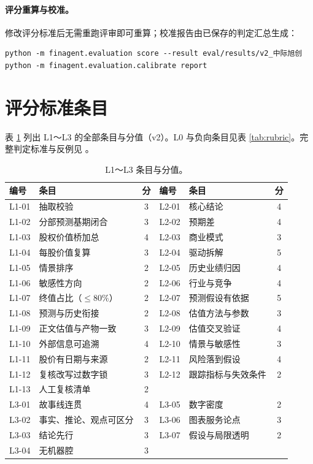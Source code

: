 \paragraph{评分重算与校准。}修改评分标准后无需重跑评审即可重算；校准报告由已保存的判定汇总生成：
\begin{verbatim}
python -m finagent.evaluation score --result eval/results/v2_中际旭创
python -m finagent.evaluation.calibrate report
\end{verbatim}

\section{评分标准条目}
\label{app:rubric}

表 \ref{tab:rubric-full} 列出 L1～L3 的全部条目与分值（v2）。L0 与负向条目见表 \ref{tab:rubric}。完整判定标准与反例见 。

\begin{table}[h]
\centering
\caption{L1～L3 条目与分值。}
\label{tab:rubric-full}
\small
\begin{tabular}{@{}llc@{\hspace{1.2em}}llc@{}}
\toprule
编号 & 条目 & 分 & 编号 & 条目 & 分 \\
\midrule
L1-01 & 抽取校验 & 3 & L2-01 & 核心结论 & 4 \\
L1-02 & 分部预测基期闭合 & 3 & L2-02 & 预期差 & 4 \\
L1-03 & 股权价值桥加总 & 4 & L2-03 & 商业模式 & 3 \\
L1-04 & 每股价值复算 & 3 & L2-04 & 驱动拆解 & 5 \\
L1-05 & 情景排序 & 2 & L2-05 & 历史业绩归因 & 4 \\
L1-06 & 敏感性方向 & 2 & L2-06 & 行业与竞争 & 4 \\
L1-07 & 终值占比（$\le 80\%$） & 2 & L2-07 & 预测假设有依据 & 5 \\
L1-08 & 预测与历史衔接 & 2 & L2-08 & 估值方法与参数 & 3 \\
L1-09 & 正文估值与产物一致 & 3 & L2-09 & 估值交叉验证 & 4 \\
L1-10 & 外部信息可追溯 & 4 & L2-10 & 情景与敏感性 & 3 \\
L1-11 & 股价有日期与来源 & 2 & L2-11 & 风险落到假设 & 4 \\
L1-12 & 复核改写过数字锁 & 3 & L2-12 & 跟踪指标与失效条件 & 2 \\
L1-13 & 人工复核清单 & 2 & & & \\
\midrule
L3-01 & 故事线连贯 & 4 & L3-05 & 数字密度 & 2 \\
L3-02 & 事实、推论、观点可区分 & 3 & L3-06 & 图表服务论点 & 3 \\
L3-03 & 结论先行 & 3 & L3-07 & 假设与局限透明 & 2 \\
L3-04 & 无机器腔 & 3 & & & \\
\bottomrule
\end{tabular}
\end{table}

